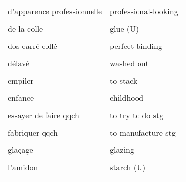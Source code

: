\documentclass[
  10pt,
]{article}
\begin{document}
\begin{longtable}{ll}
d'apparence professionnelle & professional-looking\\

\cellcolor{gray!6}{de la cire} & \cellcolor{gray!6}{wax (U)}\\

de la colle & glue (U)\\

\cellcolor{gray!6}{dorure à chaud} & \cellcolor{gray!6}{hot foil stamping}\\

dos carré-collé & perfect-binding\\

\cellcolor{gray!6}{décrire} & \cellcolor{gray!6}{to describe}\\

délavé & washed out\\

\cellcolor{gray!6}{dépenser (ou passer du temps)} & \cellcolor{gray!6}{to spend}\\

empiler & to stack\\

\cellcolor{gray!6}{encre} & \cellcolor{gray!6}{ink}\\

enfance & childhood\\

\cellcolor{gray!6}{enlever} & \cellcolor{gray!6}{to remove}\\

essayer de faire qqch & to try to do stg\\

\cellcolor{gray!6}{expédier qqch} & \cellcolor{gray!6}{to ship out stg}\\

fabriquer qqch & to manufacture stg\\

\cellcolor{gray!6}{faire du télétravail} & \cellcolor{gray!6}{to work from home}\\

glaçage & glazing\\

\cellcolor{gray!6}{hauteur} & \cellcolor{gray!6}{height}\\

l'amidon & starch (U)\\

\cellcolor{gray!6}{la couverture} & \cellcolor{gray!6}{the cover}\\


\end{longtable}
\end{document}
